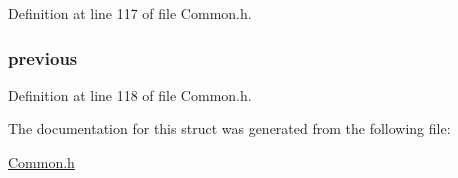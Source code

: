 Definition at line 117 of file Common.\+h.

\hypertarget{structsystem_state_af2f2716b4afa23c8b53a9351a0924b6b}{
\subsubsection[{previous}]{ previous}}\label{structsystem_state_af2f2716b4afa23c8b53a9351a0924b6b}


Definition at line 118 of file Common.\+h.



The documentation for this struct was generated from the following file\+:\begin{DoxyCompactItemize}
\item 
\hyperlink{_common_8h}{Common.\+h}\end{DoxyCompactItemize}
